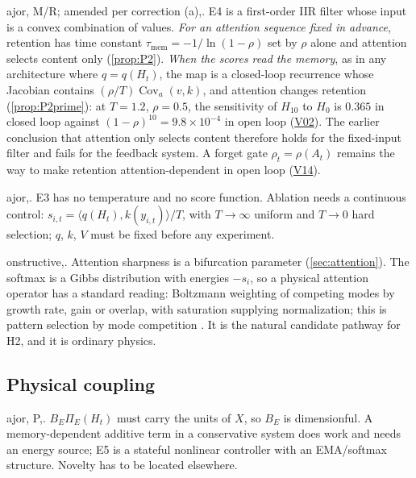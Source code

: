 \documentclass[11pt]{article}
\makeatletter
\theoremstyle{definition}
\theoremstyle{remark}
\newcommand{\Cov}{\operatorname{Cov}}
\newcommand{\V}[1]{\hyperref[app:verify]{\textsf{#1}}}
\def\finding@split#1,#2\@nil{\textbf{#1}\if\relax\detokenize{#2}\relax\else\ (\ignorespaces\finding@strip#2\@nil)\fi}
\def\finding@strip#1,\@nil{#1}
\newenvironment{finding}[1][]{\par\smallskip\noindent\finding@split#1,\@nil.\enspace\ignorespaces}{\par\smallskip}
\makeatother
\begin{document}
\begin{finding}[F9, major, M/R; amended per correction (a)] E4 is a first-order IIR filter whose input is a convex combination of values. \emph{For an attention sequence fixed in advance}, retention has time constant $\tau_{\mathrm{mem}}=-1/\ln(1-\rho)$ set by $\rho$ alone and attention selects content only (\cref{prop:P2}). \emph{When the scores read the memory}, as in any architecture where $q=q(H_t)$, the map is a closed-loop recurrence whose Jacobian contains $(\rho/T)\Cov_a(v,k)$, and attention changes retention (\cref{prop:P2prime}): at $T=1.2$, $\rho=0.5$, the sensitivity of $H_{10}$ to $H_0$ is $0.365$ in closed loop against $(1-\rho)^{10}=9.8\times10^{-4}$ in open loop (\V{V02}). The earlier conclusion that attention only selects content therefore holds for the fixed-input filter and fails for the feedback system. A forget gate $\rho_t=\rho(A_t)$ remains the way to make retention attention-dependent in open loop (\V{V14}).
\end{finding}

\begin{finding}[F10, major] E3 has no temperature and no score function. Ablation needs a continuous control: $s_{i,t}=\langle q(H_t),k(y_{i,t})\rangle/T$, with $T\to\infty$ uniform and $T\to0$ hard selection; $q$, $k$, $V$ must be fixed before any experiment.
\end{finding}

\begin{finding}[F11--F12, constructive] Attention sharpness is a bifurcation parameter (\cref{sec:attention}). The softmax is a Gibbs distribution with energies $-s_i$, so a physical attention operator has a standard reading: Boltzmann weighting of competing modes by growth rate, gain or overlap, with saturation supplying normalization; this is pattern selection by mode competition \cite{CrossHohenberg1993}. It is the natural candidate pathway for H2, and it is ordinary physics.
\end{finding}

\subsection{Physical coupling}
\begin{finding}[F13, major, P] $B_E\Pi_E(H_t)$ must carry the units of $X$, so $B_E$ is dimensionful. A memory-dependent additive term in a conservative system does work and needs an energy source; E5 is a stateful nonlinear controller with an EMA/softmax structure. Novelty has to be located elsewhere.
\end{finding}
\end{document}
